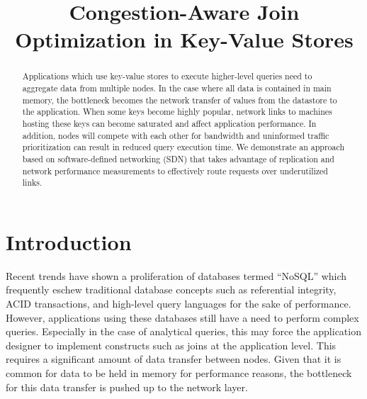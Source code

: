 \documentclass{acm_proc_article-sp}
\begin{document}
\hypersetup{pdftitle=Congestion-Aware Join Optimization in Key-Value Stores}

\title{Congestion-Aware Join Optimization in Key-Value Stores}

\author{
}

\maketitle

\begin{abstract}
Applications which use key-value stores to execute higher-level queries need to aggregate data from multiple nodes.
In the case where all data is contained in main memory, the bottleneck becomes the network transfer of values from the datastore to the application.
When some keys become highly popular, network links to machines hosting these keys can become saturated and affect application performance.
In addition, nodes will compete with each other for bandwidth and uninformed traffic prioritization can result in reduced query execution time.
We demonstrate an approach based on software-defined networking (SDN) that takes advantage of replication and network performance measurements to effectively route requests over underutilized links.
\end{abstract}

\section{Introduction}

Recent trends have shown a proliferation of databases termed ``NoSQL'' which frequently eschew traditional database concepts such as referential integrity, ACID transactions, and high-level query languages for the sake of performance.
However, applications using these databases still have a need to perform complex queries.
Especially in the case of analytical queries, this may force the application designer to implement constructs such as joins at the application level.
This requires a significant amount of data transfer between nodes.
Given that it is common for data to be held in memory for performance reasons, the bottleneck for this data transfer is pushed up to the network layer.
\end{document}
